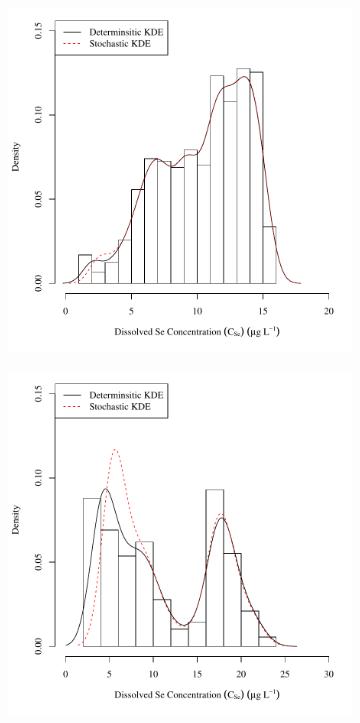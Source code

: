 \begin{linenumbers}
\subfiguremid
\begin{landscape}
	\begin{figure}
		\begin{subfigure}{0.7\textwidth}
			\centering
			\includegraphics[width=\tableCustomSize]{"Figures/Results_USR/Stochastic/c d&s est RFD"}
		\end{subfigure}%
		\begin{subfigure}{0.7\textwidth}
			\centering
			\includegraphics[width=\tableCustomSize]{"Figures/Results_USR/Stochastic/c d&s est TIM"}

\end{subfigure}
\end{figure}
\end{landscape}
\end{linenumbers}
